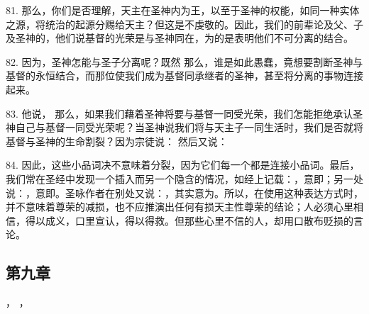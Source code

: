 81. 那么，你们是否理解，天主在圣神内为王，以至于圣神的权能，如同一种实体之源，将统治的起源分赐给天主？但这是不虔敬的。因此，我们的前辈论及父、子及圣神的，他们说基督的光荣是与圣神同在，为的是表明他们不可分离的结合。\par

82. 因为，圣神怎能与圣子分离呢？既然  那么，谁是如此愚蠢，竟想要割断圣神与基督的永恒结合，而那位使我们成为基督同承继者的圣神，甚至将分离的事物连接起来。\par

83.  他说，  那么，如果我们藉着圣神将要与基督一同受光荣，我们怎能拒绝承认圣神自己与基督一同受光荣呢？当圣神说我们将与天主子一同生活时，我们是否就将基督与圣神的生命割裂？因为宗徒说： 然后又说： \par

84. 因此，这些小品词决不意味着分裂，因为它们每一个都是连接小品词。最后，我们常在圣经中发现一个插入而另一个隐含的情况，如经上记载：，意即；另一处说：，意即。圣咏作者在别处又说：，其实意为。所以，在使用这种表达方式时，并不意味着尊荣的减损，也不应推演出任何有损天主性尊荣的结论；人必须心里相信，得以成义，口里宣认，得以得救。但那些心里不信的人，却用口散布贬损的言论。\par


\subsection{第九章}

， ， \par

